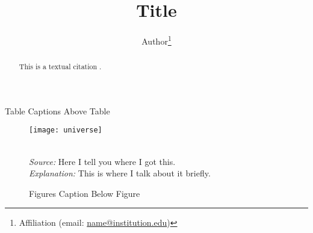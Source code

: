 \documentclass{cgu}
\title{Title}
\author{Author\thanks{Affiliation (email: \href{mailto:name@institution.edu}{name@institution.edu})}}
\begin{document}
\maketitle

\begin{abstract}
This is a textual citation \citet{Einstein1905}.
\end{abstract}

\begin{table}[!hbpt]
    \caption{Table Captions Above Table}
    
    \label{tab:Table1}
\end{table}

\begin{figure}[!hbpt]
    {\centering
    \texttt{[image: universe]}
    }\\
    \raggedright
    \footnotesize
    \emph{\\Source:} Here I tell you where I got this.\\
    \emph{Explanation:} This is where I talk about it briefly.
    \caption{Figures Caption Below Figure}
    \label{fig:Figure1}
\end{figure}

\printbibliography
\end{document}
